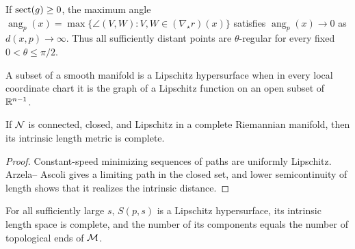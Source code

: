 \begin{lemma}
\label{lem:chow-iii-i37-angle-decay}
If $\operatorname{sect}(g)\ge0$, the maximum angle
$\operatorname{ang}_p(x)=\max\{\angle(V,W):V,W\in(\nabla_\star r)(x)\}$
satisfies $\operatorname{ang}_p(x)\to0$ as $d(x,p)\to\infty$.  Thus all
sufficiently distant points are $\theta$-regular for every fixed
$0<\theta\le\pi/2$.
\end{lemma}

\begin{definition}
\label{def:chow-iii-i39-lipschitz-hypersurface}
A subset of a smooth manifold is a Lipschitz hypersurface when in every local
coordinate chart it is the graph of a Lipschitz function on an open subset of
$\mathbb R^{n-1}$.
\end{definition}

\begin{lemma}
\label{lem:chow-iii-i40-lipschitz-complete}
If $\N$ is connected, closed, and Lipschitz in a complete Riemannian
manifold, then its intrinsic length metric is complete.
\end{lemma}
\begin{proof}
Constant-speed minimizing sequences of paths are uniformly Lipschitz.  Arzela--
Ascoli gives a limiting path in the closed set, and lower semicontinuity of
length shows that it realizes the intrinsic distance.
\end{proof}

\begin{proposition}
\label{prop:chow-iii-i41-large-distance-spheres}
For all sufficiently large $s$, $S(p,s)$ is a Lipschitz hypersurface, its
intrinsic length space is complete, and the number of its components equals the
number of topological ends of $\M$.
\end{proposition}

